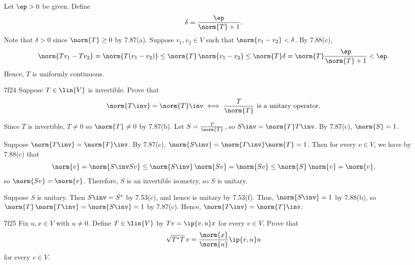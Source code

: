 \begin{sol}
    Let $\ep > 0$ be given.
    Define
    \[
        \delta = \frac{\ep}{\norm{T} + 1}.
    \]
    Note that $\delta > 0$ since $\norm{T} \geq 0$ by 7.87(a).
    Suppose $v_1, v_2 \in V$ such that $\norm{v_1 - v_2} < \delta$.
    By 7.88(c),
    \[
        \norm{Tv_1 - Tv_2} = \norm{T(v_1 - v_2)} \leq \norm{T}\,\norm{v_1 - v_2} \leq \norm{T} \delta = \norm{T} \frac{\ep}{\norm{T} + 1} < \ep.
    \]
    Hence, $T$ is uniformly continuous.
\end{sol}

\begin{exercise}{7f24}
    Suppose $T \in \lin{V}$ is invertible.
    Prove that
    \[
        \norm{T\inv} = \norm{T}\inv \iff \frac{T}{\norm{T}} \text{ is a unitary operator}.
    \]
\end{exercise}

\begin{sol}
    Since $T$ is invertible, $T \neq 0$ so $\norm{T} \neq 0$ by 7.87(b).
    Let $S = \frac{T}{\norm{T}}$, so $S\inv = \norm{T} T\inv$.
    By 7.87(c), $\norm{S} = 1$.

    \rightimp Suppose $\norm{T\inv} = \norm{T}\inv$.
    By 7.87(c), $\norm{S\inv} = \norm{T\inv} \norm{T} = 1$.
    Then for every $v \in V$, we have by 7.88(c) that
    \[
        \norm{v} = \norm{S\inv S v} \leq \norm{S\inv}\,\norm{S v} = \norm{S v} \leq \norm{S}\,\norm{v} = \norm{v},
    \]
    so $\norm{S v} = \norm{v}$.
    Therefore, $S$ is an invertible isometry, so $S$ is unitary.

    \leftimp Suppose $S$ is unitary.
    Then $S\inv = S^\ast$ by 7.53(c), and hence is unitary by 7.53(f).
    Thus, $\norm{S\inv} = 1$ by 7.88(b), so $\norm{T}\,\norm{T\inv} = \norm{S\inv} = 1$ by 7.87(c).
    Hence, $\norm{T\inv} = \norm{T}\inv$.
\end{sol}

\begin{exercise}{7f25}
    Fix $u, x \in V$ with $u \neq 0$.
    Define $T \in \lin{V}$ by $Tv = \ip{v, u}x$ for every $v \in V$.
    Prove that
    \[
        \sqrt{T^\ast T}\, v = \frac{\norm{x}}{\norm{u}} \ip{v, u} u
    \]
    for every $v \in V$.
\end{exercise}

